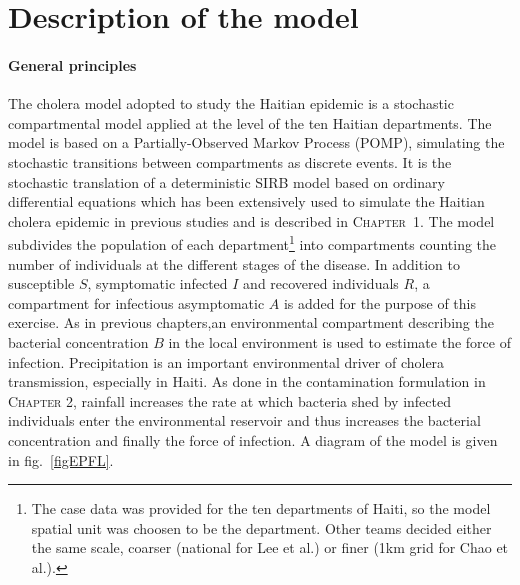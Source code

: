 \section{Description of the model}

\paragraph{General principles} The cholera model adopted to study the Haitian epidemic is a stochastic compartmental model applied at the level of the ten Haitian departments. 
The model is based on a Partially-Observed Markov Process (POMP), simulating the stochastic transitions between compartments as discrete events. 
It is the stochastic translation of a deterministic SIRB model based on ordinary differential equations which has been extensively used to simulate the Haitian cholera epidemic in previous studies\cite[-8\baselineskip]{Rinaldo:Reassessment20102011:2012,Bertuzzo:ProbabilityExtinctionHaiti:2016,Pasetto:RealtimeForecastingCholera:2018} and is described in \textsc{Chapter~1}. %
The model subdivides the population of each department\footnote[][9\baselineskip]{The case data was provided for the ten departments of Haiti, so the model spatial unit was choosen to be the department. Other teams decided either the same scale, coarser (national for Lee et al.) or finer (1km grid for Chao et al.).} into compartments counting the number of individuals at the different stages of the disease. In addition to susceptible $S$, symptomatic infected $I$ and recovered individuals $R$, a compartment for infectious asymptomatic $A$ is added for the purpose of this exercise. As in previous chapters,an environmental compartment describing the bacterial concentration $B$ in the local environment is used to estimate the force of infection. Precipitation is an important environmental driver of cholera transmission\cite{Camacho:CholeraEpidemicYemen:2018}, especially in Haiti. As done in the contamination formulation in \textsc{Chapter 2}, rainfall increases the rate at which bacteria shed by infected individuals enter the environmental reservoir and thus increases the bacterial concentration and finally the force of infection. A diagram of the model is given in fig.~\ref{figEPFL}.
